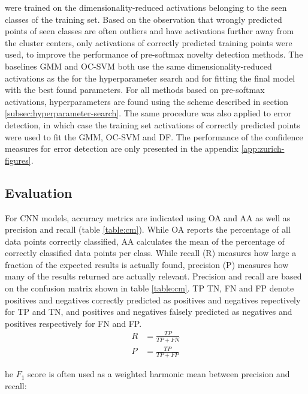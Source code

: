 \documentclass[10pt]{article}
\begin{document}
 were trained on the dimensionality-reduced activations belonging to the seen classes of the training set. Based on the observation that wrongly predicted points of seen classes are often outliers and have activations further away from the cluster centers, only activations of correctly predicted training points were used, to improve the performance of pre-softmax novelty detection methods. The baselines \gls{GMM} and \gls{OC-SVM} both use the same dimensionality-reduced activations as the  for the hyperparameter search and for fitting the final model with the best found parameters. For all methods based on pre-softmax activations, hyperparameters are found using the scheme described in section \ref{subsec:hyperparameter-search}. The same procedure was also applied to error detection, in which case the training set activations of correctly predicted points were used to fit the \gls{GMM}, \gls{OC-SVM} and \acrlong{DF}. The performance of the confidence measures for error detection are only presented in the appendix \ref{app:zurich-figures}.

\subsection{Evaluation}
For \gls{CNN} models, accuracy metrics are indicated using \gls{OA} and \gls{AA} as well as precision and recall (table \ref{table:cm}). While \gls{OA} reports the percentage of all data points correctly classified, \gls{AA} calculates the mean of the percentage of correctly classified data points per class. While recall (R) measures how large a fraction of the expected results is actually found, precision (P) measures how many of the results returned are actually relevant. Precision and recall are based on the confusion matrix shown in table \ref{table:cm}. \gls{TP} \gls{TN}, \gls{FN} and \gls{FP} denote positives and negatives correctly predicted as positives and negatives repectively for \gls{TP} and \gls{TN}, and positives and negatives falsely predicted as negatives and positives respectively for \gls{FN} and \gls{FP}.
\begin{equation}
\begin{aligned}
	R&=\frac{TP}{TP+FN}\\
	P&=\frac{TP}{TP+FP}
\end{aligned}
\end{equation}

he $F_1$ score is often used as a weighted harmonic mean between precision and recall:
\end{document}
